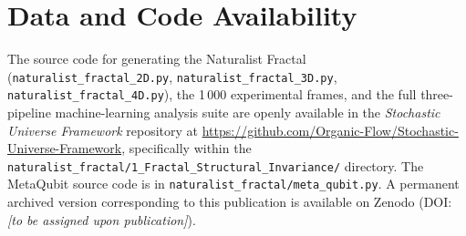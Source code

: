 \documentclass[twocolumn,amsmath,amssymb,prl]{revtex4-2}
\begin{document}
\section*{Data and Code Availability}

The source code for generating the Naturalist Fractal (\texttt{naturalist\_fractal\_2D.py},
\texttt{naturalist\_fractal\_3D.py}, \texttt{naturalist\_fractal\_4D.py}),
the 1\,000 experimental frames, and the full three-pipeline machine-learning
analysis suite are openly available in the \emph{Stochastic Universe
Framework} repository at
\url{https://github.com/Organic-Flow/Stochastic-Universe-Framework},
specifically within the
\texttt{naturalist\_fractal/1\_Fractal\_Structural\_Invariance/}
directory.  The MetaQubit source code is in
\texttt{naturalist\_fractal/meta\_qubit.py}.  A permanent archived version
corresponding to this publication is available on Zenodo
(DOI: \emph{[to be assigned upon publication]}).



\end{document}
